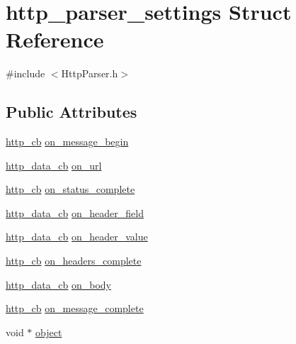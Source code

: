 \hypertarget{structhttp__parser__settings}{}\section{http\+\_\+parser\+\_\+settings Struct Reference}
\label{structhttp__parser__settings}


{\ttfamily \#include $<$Http\+Parser.\+h$>$}

\subsection*{Public Attributes}
\begin{DoxyCompactItemize}
\item 
\hyperlink{http__parser_8h_aa87f59f70dbc2c48f11a6d9a3e00addc}{http\+\_\+cb} \hyperlink{structhttp__parser__settings_ac44144daecc8e8adbd477b7e6a794e26}{on\+\_\+message\+\_\+begin}
\item 
\hyperlink{http__parser_8h_a7a2b17230dcd129c4ed47e3f9c5110a2}{http\+\_\+data\+\_\+cb} \hyperlink{structhttp__parser__settings_a9c24dfa900b49bf3439bbfba572b42fb}{on\+\_\+url}
\item 
\hyperlink{http__parser_8h_aa87f59f70dbc2c48f11a6d9a3e00addc}{http\+\_\+cb} \hyperlink{structhttp__parser__settings_a224c77dc9d35cbb456830e148eebbc8e}{on\+\_\+status\+\_\+complete}
\item 
\hyperlink{http__parser_8h_a7a2b17230dcd129c4ed47e3f9c5110a2}{http\+\_\+data\+\_\+cb} \hyperlink{structhttp__parser__settings_acfb3fd7947c5ff3e16649c71aa13bff2}{on\+\_\+header\+\_\+field}
\item 
\hyperlink{http__parser_8h_a7a2b17230dcd129c4ed47e3f9c5110a2}{http\+\_\+data\+\_\+cb} \hyperlink{structhttp__parser__settings_a2af4e9085fa79ee52b31e626179bc561}{on\+\_\+header\+\_\+value}
\item 
\hyperlink{http__parser_8h_aa87f59f70dbc2c48f11a6d9a3e00addc}{http\+\_\+cb} \hyperlink{structhttp__parser__settings_a743b24c8f33e0f1cf60a96c824c42071}{on\+\_\+headers\+\_\+complete}
\item 
\hyperlink{http__parser_8h_a7a2b17230dcd129c4ed47e3f9c5110a2}{http\+\_\+data\+\_\+cb} \hyperlink{structhttp__parser__settings_aaa145d7c24c91f471b2079ecb6368ae4}{on\+\_\+body}
\item 
\hyperlink{http__parser_8h_aa87f59f70dbc2c48f11a6d9a3e00addc}{http\+\_\+cb} \hyperlink{structhttp__parser__settings_afdd5beef93a4a7b32bc61ae088da64d2}{on\+\_\+message\+\_\+complete}
\item 
void $\ast$ \hyperlink{structhttp__parser__settings_afc237856fcbd7c83b5d948fa72fedf51}{object}
\end{DoxyCompactItemize}



